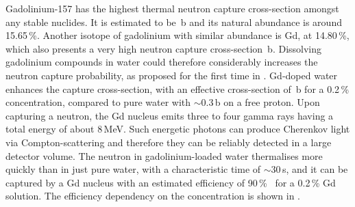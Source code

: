 Gadolinium-157 has the highest thermal neutron capture cross-section amongst any stable nuclides.
It is estimated to be \,b and its natural abundance is around 15.65\,\%.
Another isotope of gadolinium with similar abundance is Gd, at 14.80\,\%, %
which also presents a very high neutron capture cross-section \,b.
Dissolving gadolinium compounds in water could therefore considerably increases the neutron capture %
probability, as proposed for the first time in .
Gd-doped water enhances the capture cross-section, with an effective cross-section of \,b for a 0.2\,\% concentration, %
compared to pure water with $\sim$0.3\,b on a free proton.
Upon capturing a neutron, the Gd nucleus emits three to four gamma rays having a total energy of about 8\,MeV.
Such energetic photons can produce Cherenkov light via Compton-scattering and therefore they can be 
reliably detected in a large detector volume.
The neutron in gadolinium-loaded water thermalises more quickly than in just pure water, with a %
characteristic time of $\sim$30\,\textmu s, and it can be captured by a Gd nucleus with an %
estimated efficiency of 90\,\%~\cite{Beacom:2003nk} for a 0.2\,\% Gd solution.
The efficiency dependency on the concentration is shown in .

